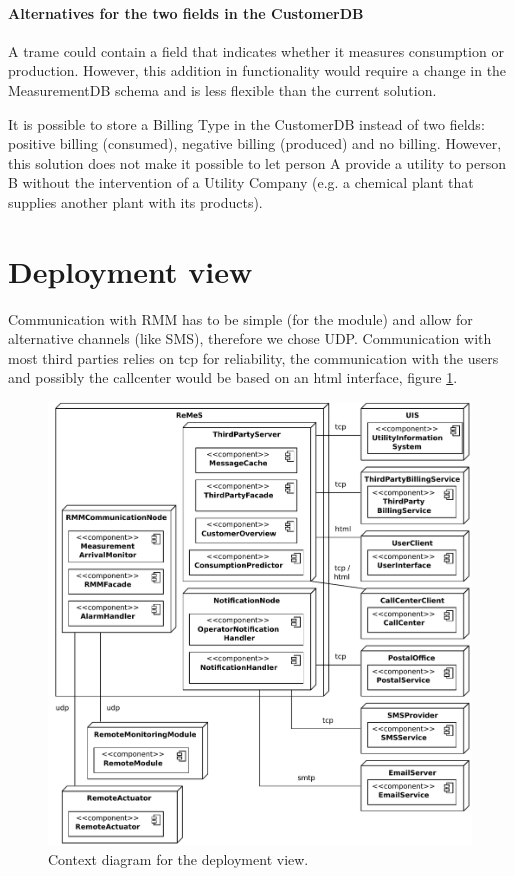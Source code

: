 \documentclass[a4paper,10pt]{article}
\begin{document}
\paragraph{Alternatives for the two fields in the CustomerDB}
A trame could contain a field that indicates whether it measures consumption or production. However, this addition in functionality would require a change in the MeasurementDB schema and is less flexible than the current solution.

It is possible to store a Billing Type in the CustomerDB instead of two fields: positive billing (consumed), negative billing (produced) and no billing. However, this solution does not make it possible to let person A provide a utility to person B without the intervention of a Utility Company (e.g. a chemical plant that supplies another plant with its products).

\section{Deployment view}\label{sec:deployment}
Communication with RMM has to be simple (for the module) and allow for alternative channels (like SMS), therefore we chose UDP.
Communication with most third parties relies on tcp for reliability, the communication with the users and possibly the callcenter would be based on an html interface, figure \ref{fig:depl_context}.

\begin{figure}[!htp]
    \centering
    \includegraphics[width=\textwidth]{Context}
    \caption{Context diagram for the deployment view.}\label{fig:depl_context}
\end{figure}
\end{document}
